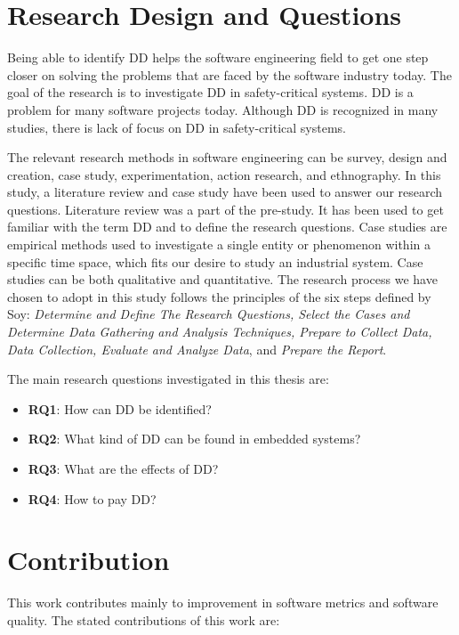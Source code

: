 \section{Research Design and Questions}
\label{sec:chap1designquesitons}
Being able to identify DD helps the software engineering field to get one step closer on solving the problems that are faced by the software industry today. The goal of the research is to investigate DD in safety-critical systems. DD is a problem for many software projects today. Although DD is recognized in many studies, there is lack of focus on DD in safety-critical systems. 

The relevant research methods in software engineering can be survey, design and creation, case study, experimentation, action research, and ethnography\cite{Oates:2006:RIS:1202299}. In this study, a literature review and case study have been used to answer our research questions. Literature review was a part of the pre-study. It has been used to get familiar with the term DD and to define the research questions. Case studies are empirical methods used to investigate a single entity or phenomenon within a specific time space\cite{Wohlin:2000:ESE:330775}, which fits our desire to study an industrial system. Case studies can be both qualitative and quantitative\cite{bassey2003case,Oates:2006:RIS:1202299}. The research process we have chosen to adopt in this study follows the principles of the six steps defined by Soy\cite{soysusan}: \textit{Determine and Define The Research Questions, Select the Cases and Determine Data Gathering and Analysis Techniques, Prepare to Collect Data, Data Collection, Evaluate and Analyze Data}, and \textit{Prepare the Report}.

The main research questions investigated in this thesis are:

\begin{itemize}
	\item \textbf{RQ1}: How can DD be identified?
	\item \textbf{RQ2}: What kind of DD can be found in embedded systems?
	\item \textbf{RQ3}: What are the effects of DD?
	\item \textbf{RQ4}: How to pay DD?
\end{itemize}

\section{Contribution}
This work contributes mainly to improvement in software metrics and software quality. The stated contributions of this work are:

